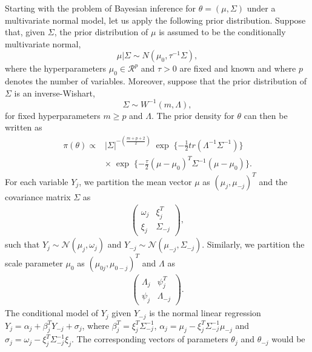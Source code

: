 	Starting with the problem of Bayesian inference for $\theta = (\mu, \Sigma)$ under a multivariate normal model, let us apply the following prior distribution. Suppose that, given $\Sigma$, the prior distribution of $\mu$ is assumed to be the conditionally multivariate normal,
	\begin{equation}
		\mu | \Sigma \sim N(\mu_{0}, \tau^{-1}\Sigma),
	\end{equation}
	where the hyperparameters $\mu_{0} \in \mathcal{R}^{p}$ and $\tau > 0$ are fixed and known and where $p$ denotes the number of variables. Moreover, suppose that the prior distribution of $\Sigma$ is an inverse-Wishart,
	\begin{equation}
		\Sigma \sim W^{-1}(m, \Lambda),
	\end{equation}
	for fixed hyperparameters $m \ge p$ and $\Lambda$. The prior density for $\theta$ can then be written as
	\begin{equation}
		\begin{array}{ll}
			\pi(\theta) \propto &|\Sigma|^{-(\frac{m+p+2}{2})}\;\exp\;\{-\frac{1}{2}tr(\Lambda^{-1}\Sigma^{-1})\}\\
			& \times\;\exp\;\{-\frac{\tau}{2}(\mu-\mu_{0})^{T}\Sigma^{-1}(\mu-\mu_{0})\}.
		\end{array}	
	\end{equation}
	For each variable $Y_{j}$, we partition the mean vector $\mu$ as $(\mu_j, \mu_{-j})^T$ and the covariance matrix $\Sigma$ as 
	\begin{eqnarray*}
		\left(\begin{array}{cc}
			\omega_{j} & \xi_{j}^T\\
			\xi_{j} & \Sigma_{-j} 
		\end{array}\right),
	\end{eqnarray*}
	such that $Y_j \sim \mathcal{N}(\mu_j, \omega_{j})$ and $Y_{-j} \sim \mathcal{N}(\mu_{-j}, \Sigma_{-j})$. Similarly, we partition the scale parameter $\mu_{0}$ as $(\mu_{0j}, \mu_{0-j})^T$ and $\Lambda$ as
	\begin{eqnarray*}
		\left(\begin{array}{cc}
			\Lambda_{j} & \psi_{j}^T\\
			\psi_{j} & \Lambda_{-j} 
		\end{array}\right).
	\end{eqnarray*}
	The conditional model of $Y_j$ given $Y_{-j}$ is the normal linear regression $Y_{j} = \alpha_j + \beta_{j}^TY_{-j} + \sigma_{j}$, where $\beta_{j}^T = \xi_{j}^T\Sigma_{-j}^{-1}$, $\alpha_j = \mu_j - \xi_{j}^T\Sigma_{-j}^{-1}\mu_{-j}$ and $\sigma_{j} = \omega_{j} - \xi_{j}^T\Sigma_{-j}^{-1}\xi_{j}$. The corresponding vectors of parameters $\theta_{j}$ and $\theta_{-j}$ would be 
